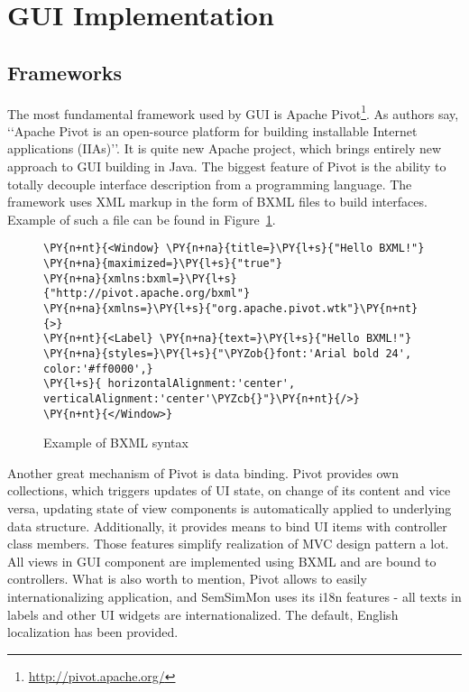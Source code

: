 \section{GUI Implementation}
\subsection{Frameworks}

The most fundamental framework used by GUI is Apache Pivot\footnote{\url{http://pivot.apache.org/}}. As authors say, \lq\lq{}Apache Pivot is an open-source platform for building installable Internet applications (IIAs)\rq\rq{}. It is quite new Apache project, which brings entirely new approach to GUI building in Java. The biggest feature of Pivot is the ability to totally decouple interface description from a programming language. The framework uses XML markup in the form of BXML files to build interfaces. Example of such a file can be found in Figure~\ref{fig:bxml_example}.

\begin{figure}[ht]
\centering
\begin{Verbatim}[commandchars=\\\{\},frame=single,framerule=0.2pt] 
\PY{n+nt}{<Window} \PY{n+na}{title=}\PY{l+s}{"Hello BXML!"} \PY{n+na}{maximized=}\PY{l+s}{"true"} 
\PY{n+na}{xmlns:bxml=}\PY{l+s}{"http://pivot.apache.org/bxml"} 
\PY{n+na}{xmlns=}\PY{l+s}{"org.apache.pivot.wtk"}\PY{n+nt}{>} 
\PY{n+nt}{<Label} \PY{n+na}{text=}\PY{l+s}{"Hello BXML!"} 
\PY{n+na}{styles=}\PY{l+s}{"\PYZob{}font:'Arial bold 24', color:'#ff0000',} 
\PY{l+s}{ horizontalAlignment:'center', verticalAlignment:'center'\PYZcb{}"}\PY{n+nt}{/>} 
\PY{n+nt}{</Window>} 
\end{Verbatim} 
\caption{Example of BXML syntax}
\label{fig:bxml_example}
\end{figure}

Another great mechanism of Pivot is data binding. Pivot provides own collections, which triggers updates of UI state, on change of its content and vice versa, updating state of view components is automatically applied to underlying data structure. Additionally, it provides means to bind UI items with controller class members. Those features simplify realization of MVC design pattern a lot. All views in GUI component are implemented using BXML and are bound to controllers. What is also worth to mention, Pivot allows to easily internationalizing application, and SemSimMon uses its i18n features - all texts in labels and other UI widgets are internationalized. The default, English localization has been provided.

